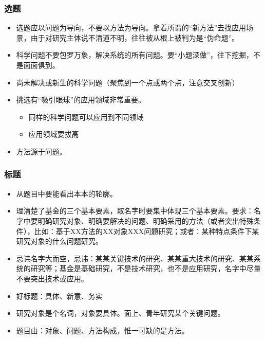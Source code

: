 \subsubsection{选题}
\begin{itemize}
\item 选题应以问题为导向，不要以方法为导向。拿着所谓的“新方法”去找应用场景，由于对研究主体说不清道不明，往往被从根上被判为是“伪命题”。

\item 科学问题不要包罗万象，解决系统的所有问题。要“小题深做”，往下挖掘，不是面面俱到。

\item 尚未解决或新生的科学问题（聚焦到一个点或两个点，注意交叉创新）

\item 挑选有“吸引眼球”的应用领域非常重要。
	\begin{itemize}
	\item 同样的科学问题可以应用到不同领域
	\item 应用领域要拔高
	\end{itemize}
\item 方法源于问题。
\end{itemize}



\subsubsection{标题}
\begin{itemize}
\item {\color{red} 从题目中要能看出本本的轮廓。}

\item 理清楚了基金的三个基本要素，取名字时要集中体现三个基本要素。要求：名字中要明确研究对象、明确要解决的问题、明确采用的方法（或者突出特殊条件），比如：基于XX方法的XX对象XXX问题研究；或者：某种特点条件下某研究对象的什么问题研究。

\item 忌讳名字大而空，忌讳：某某关键技术的研究、某某重大技术的研究、某某系统的研究等；基金是基础研究，不是技术研究，也不是应用研究，名字中尽量不要突出技术或应用。

\item 好标题：具体、新意、务实

\item 研究对象是个名词，对象要具体。面上、青年研究某个关键问题。

\item 题目由：对象、问题、方法构成，惟一可缺的是方法。
\end{itemize}




